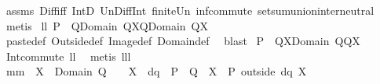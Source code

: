 \begin{isabellebody}
%
\isadelimproof
%
\endisadelimproof
%
\isatagproof
{}\isamarkupfalse%
\ assms\ Diff{\isacharunderscore}iff\ IntD{}\ Un{\isacharunderscore}Diff{\isacharunderscore}Int\ finite{\isacharunderscore}Un\ inf{\isacharunderscore}commute\ setsum{\isachardot}union{\isacharunderscore}inter{\isacharunderscore}neutral\ \isamarkupfalse%
\ metis%
\endisatagproof
{\isafoldproof}%
%
\isadelimproof
\isanewline
%
\endisadelimproof
\isanewline
{}\isamarkupfalse%
\ ll{}{}{\isacharcolon}\ {\isachardoublequoteopen}{\isacharparenleft}P\ {\isacharplus}{\isacharasterisk}\ Q{\isacharparenright}{\isacharbackquote}{\isacharbackquote}{\isacharparenleft}Domain\ Q{\isasyminter}X{\isacharparenright}{\isacharequal}Q{\isacharbackquote}{\isacharbackquote}{\isacharparenleft}Domain\ Q{\isasyminter}X{\isacharparenright}{\isachardoublequoteclose}\ \isanewline
%
\isadelimproof
%
\endisadelimproof
%
\isatagproof
{}\isamarkupfalse%
\ paste{\isacharunderscore}def\ Outside{\isacharunderscore}def\ Image{\isacharunderscore}def\ Domain{\isacharunderscore}def\ \isamarkupfalse%
\ blast%
\endisatagproof
{\isafoldproof}%
%
\isadelimproof
\isanewline
%
\endisadelimproof
\isanewline
{}\isamarkupfalse%
\ {\isachardoublequoteopen}{\isacharparenleft}P\ {\isacharplus}{\isacharasterisk}\ Q{\isacharparenright}{\isacharbackquote}{\isacharbackquote}{\isacharparenleft}X{\isasyminter}{\isacharparenleft}Domain\ Q{\isacharparenright}{\isacharparenright}{\isacharequal}Q{\isacharbackquote}{\isacharbackquote}X{\isachardoublequoteclose}%
\isadelimproof
\ %
\endisadelimproof
%
\isatagproof
{}\isamarkupfalse%
\ Int{\isacharunderscore}commute\ ll{}{}\ \isamarkupfalse%
\ {\isacharparenleft}metis\ lll{}{}{\isacharparenright}%
\endisatagproof
{\isafoldproof}%
%
\isadelimproof
%
\endisadelimproof
\isanewline
\isanewline
{}\isamarkupfalse%
\ mm{}{}{\isacharcolon}\ \ {\isachardoublequoteopen}X\ {\isasyminter}\ Domain\ Q\ {\isacharequal}\ {\isacharbraceleft}{\isacharbraceright}{\isachardoublequoteclose}\ {\isacharparenleft}\ {\isachardoublequoteopen}X\ {\isasyminter}\ {\isacharquery}dq{\isacharequal}{\isacharbraceleft}{\isacharbraceright}{\isachardoublequoteclose}{\isacharparenright}\ \ {\isachardoublequoteopen}{\isacharparenleft}P\ {\isacharplus}{\isacharasterisk}\ Q{\isacharparenright}\ {\isacharbackquote}{\isacharbackquote}\ X\ {\isacharequal}\ {\isacharparenleft}P\ outside\ {\isacharquery}dq{\isacharparenright}{\isacharbackquote}{\isacharbackquote}\ X{\isachardoublequoteclose}\ \isanewline

\end{isabellebody}
